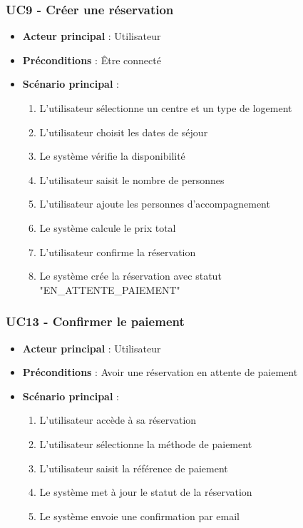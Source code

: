 \documentclass[12pt,a4paper]{article}
\begin{document}
\subsubsection{UC9 - Créer une réservation}
\begin{itemize}
    \item \textbf{Acteur principal} : Utilisateur
    \item \textbf{Préconditions} : Être connecté
    \item \textbf{Scénario principal} :
    \begin{enumerate}
        \item L'utilisateur sélectionne un centre et un type de logement
        \item L'utilisateur choisit les dates de séjour
        \item Le système vérifie la disponibilité
        \item L'utilisateur saisit le nombre de personnes
        \item L'utilisateur ajoute les personnes d'accompagnement
        \item Le système calcule le prix total
        \item L'utilisateur confirme la réservation
        \item Le système crée la réservation avec statut "EN\_ATTENTE\_PAIEMENT"
    \end{enumerate}
\end{itemize}

\subsubsection{UC13 - Confirmer le paiement}
\begin{itemize}
    \item \textbf{Acteur principal} : Utilisateur
    \item \textbf{Préconditions} : Avoir une réservation en attente de paiement
    \item \textbf{Scénario principal} :
    \begin{enumerate}
        \item L'utilisateur accède à sa réservation
        \item L'utilisateur sélectionne la méthode de paiement
        \item L'utilisateur saisit la référence de paiement
        \item Le système met à jour le statut de la réservation
        \item Le système envoie une confirmation par email
    \end{enumerate}
\end{itemize}
\end{document}

